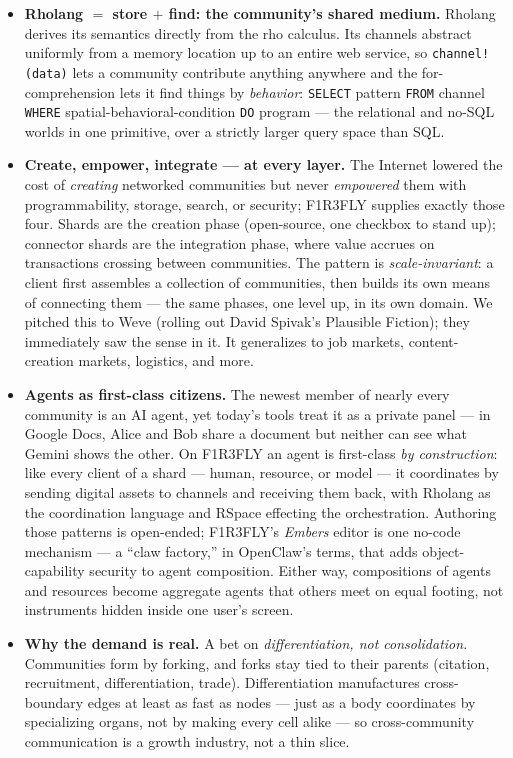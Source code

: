 \documentclass[11pt]{article}
\begin{document}
\begin{keybox}
\begin{itemize}[leftmargin=1.2em, itemsep=4pt, topsep=4pt]
  \item \textbf{Rholang $=$ store $+$ find: the community's shared medium.} Rholang derives its semantics directly from the rho calculus. Its channels abstract uniformly from a memory location up to an entire web service, so \texttt{channel!(data)} lets a community contribute anything anywhere and the for-comprehension lets it find things by \emph{behavior}: \texttt{SELECT} pattern \texttt{FROM} channel \texttt{WHERE} spatial-behavioral-condition \texttt{DO} program --- the relational and no-SQL worlds in one primitive, over a strictly larger query space than SQL.
  \item \textbf{Create, empower, integrate --- at every layer.} The Internet lowered the cost of \emph{creating} networked communities but never \emph{empowered} them with programmability, storage, search, or security; F1R3FLY supplies exactly those four. Shards are the creation phase (open-source, one checkbox to stand up); connector shards are the integration phase, where value accrues on transactions crossing between communities. The pattern is \emph{scale-invariant}: a client first assembles a collection of communities, then builds its own means of connecting them --- the same phases, one level up, in its own domain. We pitched this to Weve (rolling out David Spivak's Plausible Fiction); they immediately saw the sense in it. It generalizes to job markets, content-creation markets, logistics, and more.
  \item \textbf{Agents as first-class citizens.} The newest member of nearly every community is an AI agent, yet today's tools treat it as a private panel --- in Google Docs, Alice and Bob share a document but neither can see what Gemini shows the other. On F1R3FLY an agent is first-class \emph{by construction}: like every client of a shard --- human, resource, or model --- it coordinates by sending digital assets to channels and receiving them back, with Rholang as the coordination language and RSpace effecting the orchestration. Authoring those patterns is open-ended; F1R3FLY's \emph{Embers} editor is one no-code mechanism --- a ``claw factory,'' in OpenClaw's terms, that adds object-capability security to agent composition. Either way, compositions of agents and resources become aggregate agents that others meet on equal footing, not instruments hidden inside one user's screen.
  \item \textbf{Why the demand is real.} A bet on \emph{differentiation, not consolidation}. Communities form by forking, and forks stay tied to their parents (citation, recruitment, differentiation, trade). Differentiation manufactures cross-boundary edges at least as fast as nodes --- just as a body coordinates by specializing organs, not by making every cell alike --- so cross-community communication is a growth industry, not a thin slice.

\end{itemize}
\end{keybox}
\end{document}
